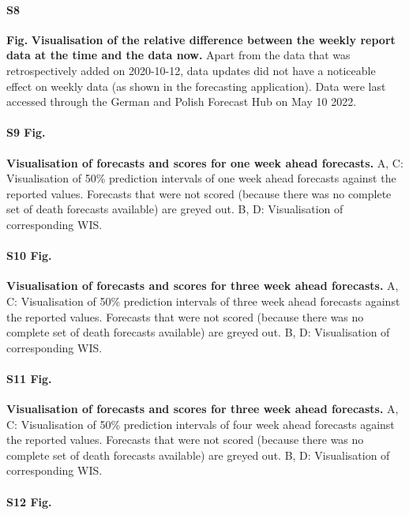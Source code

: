 \documentclass[10pt,letterpaper]{article}
\begin{document}
\paragraph{S8}

\textbf{Fig.} \label{fig:weekly-truth-update}
\textbf{Visualisation of the relative difference between the weekly report data at the time and the data now.}
Apart from the data that was retrospectively added on 2020-10-12, data
updates did not have a noticeable effect on weekly data (as shown in the
forecasting application). Data were last accessed through the German and
Polish Forecast Hub on May 10 2022.

\paragraph{S9 Fig.}
\label{fig:forecasts-and-truth-1}

\textbf{Visualisation of forecasts and scores for one week ahead forecasts.}
A, C: Visualisation of 50\% prediction intervals of one week ahead
forecasts against the reported values. Forecasts that were not scored
(because there was no complete set of death forecasts available) are
greyed out. B, D: Visualisation of corresponding WIS.

\paragraph{S10 Fig.}
\label{fig:forecasts-and-truth-3}

\textbf{Visualisation of forecasts and scores for three week ahead forecasts.}
A, C: Visualisation of 50\% prediction intervals of three week ahead
forecasts against the reported values. Forecasts that were not scored
(because there was no complete set of death forecasts available) are
greyed out. B, D: Visualisation of corresponding WIS.

\paragraph{S11 Fig.}
\label{fig:forecasts-and-truth-4}

\textbf{Visualisation of forecasts and scores for three week ahead forecasts.}
A, C: Visualisation of 50\% prediction intervals of four week ahead
forecasts against the reported values. Forecasts that were not scored
(because there was no complete set of death forecasts available) are
greyed out. B, D: Visualisation of corresponding WIS.

\paragraph{S12 Fig.}
\label{fig:distribution-scores-1}
\end{document}
